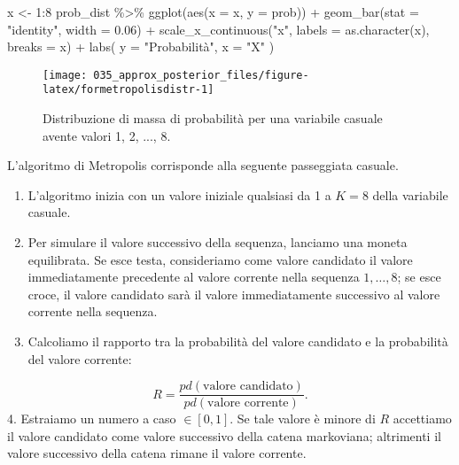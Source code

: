 \documentclass[
]{memoir}
\newenvironment{Shaded}{\begin{snugshade}}{\end{snugshade}}
\newcommand{\AttributeTok}[1]{\textcolor[rgb]{0.77,0.63,0.00}{#1}}
\newcommand{\DecValTok}[1]{\textcolor[rgb]{0.00,0.00,0.81}{#1}}
\newcommand{\FloatTok}[1]{\textcolor[rgb]{0.00,0.00,0.81}{#1}}
\newcommand{\FunctionTok}[1]{\textcolor[rgb]{0.00,0.00,0.00}{#1}}
\newcommand{\NormalTok}[1]{#1}
\newcommand{\OtherTok}[1]{\textcolor[rgb]{0.56,0.35,0.01}{#1}}
\newcommand{\SpecialCharTok}[1]{\textcolor[rgb]{0.00,0.00,0.00}{#1}}
\newcommand{\StringTok}[1]{\textcolor[rgb]{0.31,0.60,0.02}{#1}}
\begin{document}
\begin{Shaded}
\begin{Highlighting}[]
\NormalTok{x }\OtherTok{\textless{}{-}} \DecValTok{1}\SpecialCharTok{:}\DecValTok{8}
\NormalTok{prob\_dist }\SpecialCharTok{\%\textgreater{}\%}
  \FunctionTok{ggplot}\NormalTok{(}\FunctionTok{aes}\NormalTok{(}\AttributeTok{x =}\NormalTok{ x, }\AttributeTok{y =}\NormalTok{ prob)) }\SpecialCharTok{+}
  \FunctionTok{geom\_bar}\NormalTok{(}\AttributeTok{stat =} \StringTok{"identity"}\NormalTok{, }\AttributeTok{width =} \FloatTok{0.06}\NormalTok{) }\SpecialCharTok{+}
  \FunctionTok{scale\_x\_continuous}\NormalTok{(}\StringTok{"x"}\NormalTok{, }\AttributeTok{labels =} \FunctionTok{as.character}\NormalTok{(x), }\AttributeTok{breaks =}\NormalTok{ x) }\SpecialCharTok{+}
  \FunctionTok{labs}\NormalTok{(}
    \AttributeTok{y =} \StringTok{"Probabilità"}\NormalTok{,}
    \AttributeTok{x =} \StringTok{"X"}
\NormalTok{  )}
\end{Highlighting}
\end{Shaded}

\begin{figure}

{\centering \texttt{[image: 035\_approx\_posterior\_files/figure-latex/formetropolisdistr-1]} 

}

\caption{Distribuzione di massa di probabilità per una variabile casuale avente valori 1, 2, ..., 8.}\label{fig:formetropolisdistr}
\end{figure}

\noindent
L'algoritmo di Metropolis corrisponde alla seguente passeggiata casuale.

\begin{enumerate}
\def\labelenumi{\arabic{enumi}.}
\item
  L'algoritmo inizia con un valore iniziale qualsiasi da 1 a \(K=8\) della variabile casuale.
\item
  Per simulare il valore successivo della sequenza, lanciamo una moneta equilibrata. Se esce testa, consideriamo come valore candidato il valore immediatamente precedente al valore corrente nella sequenza \(1, \dots, 8\); se esce croce, il valore candidato sarà il valore immediatamente successivo al valore corrente nella sequenza.
\item
  Calcoliamo il rapporto tra la probabilità del valore candidato e la probabilità del valore corrente:
\end{enumerate}

\[
R = \frac{pd(\text{valore candidato})}{pd(\text{valore corrente})}.
\]
4. Estraiamo un numero a caso \(\in [0, 1]\). Se tale valore è minore di \(R\) accettiamo il valore candidato come valore successivo della catena markoviana; altrimenti il valore successivo della catena rimane il valore corrente.
\end{document}
